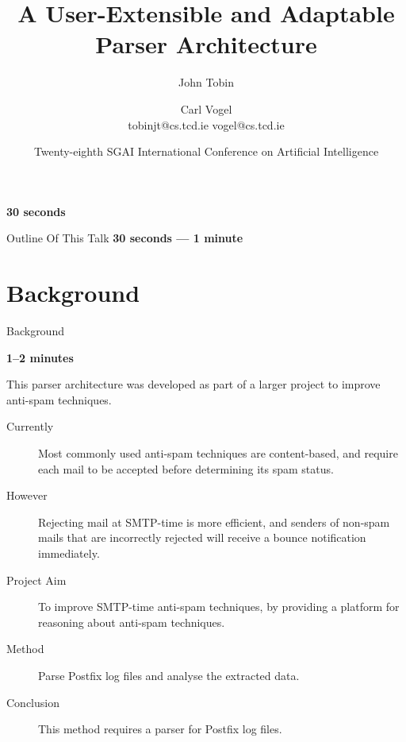 \documentclass{beamer}
\title{A User-Extensible and Adaptable Parser Architecture}
\author[John Tobin \and Carl Vogel]{John Tobin \and Carl Vogel\\
    tobinjt@cs.tcd.ie vogel@cs.tcd.ie}
\institute[Trinity College]
{
    School of Computer Science and Statistics,\\
    Trinity College, University of Dublin
}
\date[SGAI 2008]{Twenty-eighth SGAI International Conference on Artificial Intelligence}
\newcommand{\timingnote}[1]{%
    \textbf{#1}%
}
\begin{document}
\begin{frame}
    \timingnote{30 seconds}
    \titlepage{}
\end{frame}

\begin{frame}{Outline Of This Talk}
    \timingnote{30 seconds --- 1 minute}
    \tableofcontents{}
\end{frame}





\section{Background}

\begin{frame}{Background}

    \timingnote{1--2 minutes}

    This parser architecture was developed as part of a larger project to
    improve anti-spam techniques.

    \begin{description}

        \item [Currently] Most commonly used anti-spam techniques are
            content-based, and require each mail to be accepted before
            determining its spam status.

        \item [However] Rejecting mail at SMTP-time is more efficient, and
            senders of non-spam mails that are incorrectly rejected will
            receive a bounce notification immediately.

        \item [Project Aim] To improve SMTP-time anti-spam techniques, by
            providing a platform for reasoning about anti-spam techniques.

        \item [Method] Parse Postfix log files and analyse the
            extracted data.

        \item [Conclusion] This method requires a parser for Postfix log
            files.

    \end{description}

\end{frame}
\end{document}
